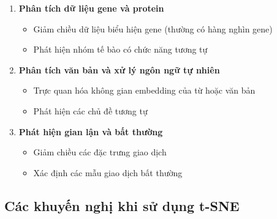 \documentclass[
]{article}
\providecommand{\tightlist}{%
  \setlength{\itemsep}{0pt}\setlength{\parskip}{0pt}}
\begin{document}
\begin{enumerate}
\def\labelenumi{\arabic{enumi}.}
\tightlist
\item
  \textbf{Phân tích dữ liệu gene và protein}

  \begin{itemize}
  \tightlist
  \item
    Giảm chiều dữ liệu biểu hiện gene (thường có hàng nghìn gene)
  \item
    Phát hiện nhóm tế bào có chức năng tương tự
  \end{itemize}
\item
  \textbf{Phân tích văn bản và xử lý ngôn ngữ tự nhiên}

  \begin{itemize}
  \tightlist
  \item
    Trực quan hóa không gian embedding của từ hoặc văn bản
  \item
    Phát hiện các chủ đề tương tự
  \end{itemize}
\item
  \textbf{Phát hiện gian lận và bất thường}

  \begin{itemize}
  \tightlist
  \item
    Giảm chiều các đặc trưng giao dịch
  \item
    Xác định các mẫu giao dịch bất thường
  \end{itemize}
\end{enumerate}

\subsection{Các khuyến nghị khi sử dụng
t-SNE}\label{cuxe1c-khuyux1ebfn-nghux1ecb-khi-sux1eed-dux1ee5ng-t-sne}
\end{document}
